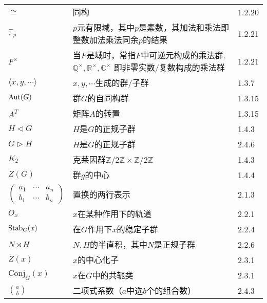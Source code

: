 \begin{longtable}{lp{.6\linewidth}l}
	$\cong$ & 同构 & 1.2.20\\
	$\mathbb{F}_p$ & $p$元有限域，其中$p$是素数，其加法和乘法即整数加法乘法同余$p$的结果 & 1.2.21\\
	$F^{\times}$ & 当$F$是域时，常指$F$中可逆元构成的乘法群. $\mathbb{Q}^{\times}, \mathbb{R}^{\times}, \mathbb{C}^{\times}$ 即非零实数/复数构成的乘法群 & 1.2.21\\
	$\langle x,y,\cdots \rangle$ & $x,y,\cdots$生成的群/子群 & 1.3.7\\
	$\operatorname{Aut}(G)$ & 群$G$的自同构群 & 1.3.15\\
	$A^T$ & 矩阵$A$的转置 & 1.3.15\\
	$H\vartriangleleft G$ & $H$是$G$的正规子群 & 1.4.3\\
	$G\vartriangleright H$ & $H$是$G$的正规子群 & 2.4.6\\
	$K_2$ & 克莱因群$\mathbb{Z}/2\mathbb{Z}\times\mathbb{Z}/2\mathbb{Z}$ & 1.4.3\\
	$Z(G)$ & 群$g$的中心 & 1.4.4\\
	$\begin{pmatrix}
		a_1 & \cdots & a_n\\
		b_1 & \cdots & b_n
	\end{pmatrix}$ & 置换的两行表示 & 2.1.3\\
	$O_x$ & $x$在某种作用下的轨道 & 2.2.1\\
	$\operatorname{Stab}_G(x)$ & 在$G$作用下$x$的稳定子群 & 2.2.4\\
	$N\rtimes H$ & $N,H$的半直积，其中$N$是正规子群 & 2.2.6\\
	$Z(x)$ & $x$的中心化子& 2.3.1\\
	$\mathrm{Conj}_G(x)$ & $x$在$G$中的共轭类 & 2.3.1\\
	$\binom{a}{b}$ & 二项式系数（$a$中选$b$个的组合数） & 2.4.3\\
	
\end{longtable}
